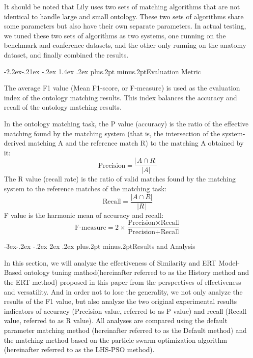 \documentclass[twoside]{article}
\makeatletter
\def\subsection{\@startsection{subsection}{2}{\z@}%
 {-3ex\@plus -.2ex \@minus -.2ex}%
 {2ex \@plus.2ex}%
{\normalfont\normalsize\protect\baselineskip=12.5pt plus.2pt minus.2pt\bfseries}}
\def\subsubsection{\@startsection{subsubsection}{3}{\z@}%
 {-2.2ex\@plus -.21ex \@minus -.2ex}%
 {1.4ex \@plus.2ex}
{\normalfont\normalsize\protect\baselineskip=12pt plus.2pt minus.2pt\sl}}
\makeatother
\begin{document}
It should be noted that Lily uses two sets of matching algorithms that are not identical to handle large and small ontology. These two sets of algorithms share some parameters but also have their own separate parameters.
In actual testing, we tuned these two sets of algorithms as two systems, one running on the benchmark and conference datasets, and the other only running on the anatomy dataset, and finally combined the results.

\subsubsection{Evaluation Metric}

The average F1 value (Mean F1-score, or F-measure)\cite{wwy59} is used as the evaluation index of the ontology matching results. This index balances the accuracy and recall of the ontology matching results.

In the ontology matching task, the P value (accuracy) is the ratio of the effective matching found by the matching system (that is, the intersection of the system-derived matching A and the reference match R) to the matching A obtained by it:
\begin{equation}
\text{Precision} = \frac{{\left| {A \cap R} \right|}}{{\left| A \right|}}
\end{equation}
The R value (recall rate) is the ratio of valid matches found by the matching system to the reference matches of the matching task:
\begin{equation}
\text{Recall} = \frac{{\left| {A \cap R} \right|}}{{\left| {R} \right|}}
\end{equation}
F value is the harmonic mean of accuracy and recall:
\begin{equation}
\text{F-measure} = {2}\times\frac{\text{Precision} \times \text{Recall}}{\text{Precision} + \text{Recall}}
\end{equation}

\subsection{Results and Analysis}

In this section, we will analyze the effectiveness of Similarity and ERT Model-Based ontology tuning mathod(hereinafter referred to as the History method and the ERT method) proposed in this paper from the perspectives of effectiveness and versatility.
And in order not to lose the generality, we not only analyze the results of the F1 value, but also analyze the two original experimental results indicators of accuracy (Precision value, referred to as P value) and recall (Recall value, referred to as R value).
All analyses are compared using the default parameter matching method (hereinafter referred to as the Default method) and the matching method based on the particle swarm optimization algorithm (hereinafter referred to as the LHS-PSO method).
\end{document}
